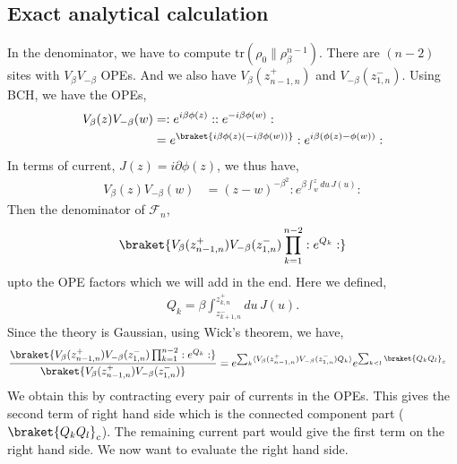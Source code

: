 \documentclass[11pt]{article}
\newcommand{\p}{\partial}
\newcommand{\lb}{\left(}
\newcommand{\rb}{\right)}
\begin{document}
\subsection{Exact analytical calculation}
In the denominator, we have to compute $\text{tr}(\rho_0\|\rho_\beta^{n-1})$. There are $(n-2)$ sites with $V_\beta V_{-\beta}$ OPEs. And we also have $V_\beta(z_{n-1,n}^+)$ and $V_{-\beta}(z_{1,n}^-)$. Using BCH, we have the OPEs,
\begin{align}
    V_\beta(z) V_{-\beta}(w) &= :e^{i\beta \phi(z)}: :e^{-i\beta \phi(w)}: \\
    &= e^{\braket{i\beta \phi(z) \lb -i \beta \phi(w)\rb}}: e^{i\beta(\phi(z) - \phi(w))} :
\end{align}
In terms of current, $J(z) = i\p \phi(z)$, we thus have,
\begin{align}\label{eq: non mixing general OPE}
    V_\beta(z) V_{-\beta}(w) &= (z-w)^{-\beta^2} : e^{\beta \int_w^z du\, J(u) } :
\end{align}
Then the denominator of $\mathcal{F}_n$,
\begin{align}
&\braket{V_\beta(z_{n-1,n}^+)V_{-\beta}(z_{1,n}^-) \prod_{k=1}^{n-2} :e^{Q_k}:} \\
\end{align}
upto the OPE factors which we will add in the end. Here we defined,
\begin{align}
    Q_k = \beta \int_{z_{k+1,n}^-}^{z_{k,n}^+} du \, J(u).
\end{align}
Since the theory is Gaussian, using Wick's theorem, we have,
\begin{align}
    \frac{\braket{V_\beta(z_{n-1,n}^+)V_{-\beta}(z_{1,n}^-) \prod_{k=1}^{n-2} :e^{Q_k}:}}{\braket {V_\beta(z_{n-1,n}^+)V_{-\beta}(z_{1,n}^-) }} 
    &= e^{\sum_k\langle V_\beta(z_{n-1,n}^+)V_{-\beta}(z_{1,n}^-)Q_k \rangle} e^{\sum_{k<l}\braket{Q_kQ_l}_c}
\end{align}
We obtain this by contracting every pair of currents in the OPEs. This gives the second term of right hand side which is the connected component part ($\braket {Q_k Q_l}_c$). The remaining current part would give the first term on the right hand side. We now want to evaluate the right hand side.
\end{document}
